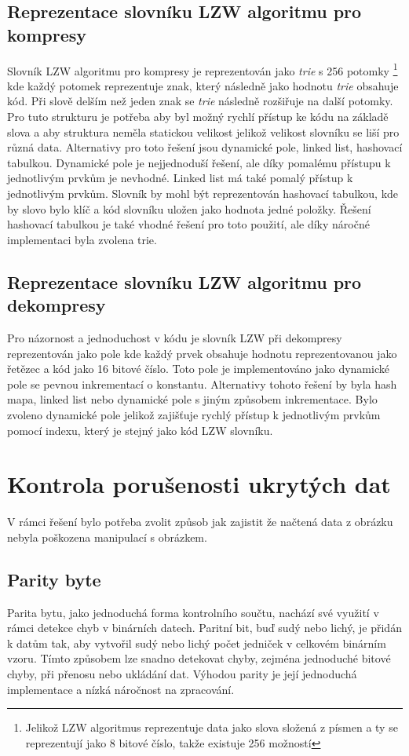 \documentclass[12pt]{report}
\begin{document}
\subsection{Reprezentace slovníku LZW algoritmu pro kompresy}
Slovník LZW algoritmu pro kompresy je reprezentován jako \textit{trie} s 256 potomky \footnote{Jelikož LZW algoritmus reprezentuje data jako slova složená z písmen a ty se reprezentují jako 8 bitové číslo, takže existuje 256 možností} kde každý potomek reprezentuje znak, který následně jako hodnotu \textit{trie} obsahuje kód. Při slově delším než jeden znak se \textit{trie} následně rozšiřuje na další potomky.
Pro tuto strukturu je potřeba aby byl možný rychlí přístup ke kódu na základě slova a aby struktura neměla statickou velikost jelikož velikost slovníku se liší pro různá data.
Alternativy pro toto řešení jsou dynamické pole, linked list, hashovací tabulkou. Dynamické pole je nejjednoduší řešení, ale díky pomalému přístupu k jednotlivým prvkům je nevhodné. Linked list má také pomalý přístup k jednotlivým prvkům. Slovník by mohl být reprezentován hashovací tabulkou, kde by slovo bylo klíč a kód slovníku uložen jako hodnota jedné položky. Řešení hashovací tabulkou je také vhodné řešení pro toto použití, ale díky náročné implementaci byla zvolena trie.

\subsection{Reprezentace slovníku LZW algoritmu pro dekompresy}
    Pro názornost a jednoduchost v kódu je slovník LZW při dekompresy reprezentován jako pole  kde každý prvek obsahuje hodnotu reprezentovanou jako řetězec a kód jako 16 bitové číslo.
    Toto pole je implementováno jako dynamické pole se pevnou inkrementací o konstantu. 
    Alternativy tohoto řešení by byla hash mapa, linked list nebo dynamické pole s jiným způsobem inkrementace. 
    Bylo zvoleno dynamické pole jelikož zajišťuje rychlý přístup k jednotlivým prvkům pomocí indexu, který je stejný jako kód LZW slovníku.


    \section{Kontrola porušenosti ukrytých dat}
    V rámci řešení bylo potřeba zvolit způsob jak zajistit že načtená data z obrázku nebyla poškozena manipulací s obrázkem.
\subsection{Parity byte}
Parita bytu, jako jednoduchá forma kontrolního součtu, nachází své využití v rámci detekce chyb v binárních datech. Paritní bit, buď sudý nebo lichý, je přidán k datům tak, aby vytvořil sudý nebo lichý počet jedniček v celkovém binárním vzoru. Tímto způsobem lze snadno detekovat chyby, zejména jednoduché bitové chyby, při přenosu nebo ukládání dat. Výhodou parity je její jednoduchá implementace a nízká náročnost na zpracování.
\end{document}
